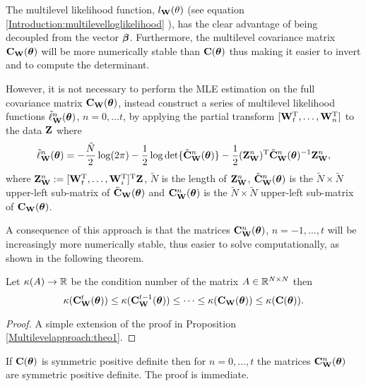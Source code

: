 \documentclass[11pt,final]{amsart}       %
\begin{document}
The multilevel likelihood function, $l_{\mathbf{W}}(\theta)$ (see equation
\eqref {Introduction:multilevelloglikelihood} ), has the clear
advantage of being decoupled from the vector $\boldsymbol{\beta}$. Furthermore,
the multilevel covariance matrix $\mathbf{C}_{\mathbf{W}}(\boldsymbol{\theta})$ will be more
numerically stable than $\mathbf{C}(\boldsymbol{\theta})$ thus making it easier to invert
and to compute the determinant.

However, it is not necessary to perform the MLE estimation on the full
covariance matrix $\mathbf{C}_{\mathbf{W}}(\boldsymbol{\theta})$, instead construct a series of
multilevel likelihood functions $\tilde{\ell}^n_{\mathbf{W}}(\boldsymbol{\theta})$, $n =
0,\dots t$, by applying the partial transform $[\mathbf{W}_t ^{\rm T}, \dots, \mathbf{W}_n
  ^{\rm T} ]$ to the data $\mathbf{Z}$ where
\begin{equation}
  \begin{split}
\tilde{\ell}^n_{\mathbf{W}}(\boldsymbol{\theta})
=-\frac{\tilde{N}}{2}\log(2\pi)-\frac{1}{2}\log
\det\{\tilde{\mathbf{C}}_{\mathbf{W}}^n(\boldsymbol{\theta})\}
-\frac{1}{2}(\mathbf{Z}^n_{\mathbf{W}})^{\rm T}\tilde{\mathbf{C}}^n_{\mathbf{W}}(\boldsymbol{\theta})^{-1}\mathbf{Z}^n_{\mathbf{W}},
\end{split}
\label{Introduction:multilevelloglikelihoodreduced2}
\end{equation}
where $\mathbf{Z}^n_{\mathbf{W}} :=[\mathbf{W}_t ^{\rm T}, \dots, \mathbf{W}_i ^{\rm T} ] ^{\rm T} \mathbf{Z}$,
$\tilde{N}$ is the length of $\mathbf{Z}^n_{\mathbf{W}}$,
$\tilde{\mathbf{C}}^n_{\mathbf{W}}(\boldsymbol{\theta})$ is the $\tilde{N} \times \tilde{N}$
upper-left sub-matrix of $\tilde{\mathbf{C}}_{\mathbf{W}}(\boldsymbol{\theta})$ and
$\mathbf{C}^n_{\mathbf{W}}(\boldsymbol{\theta})$ is the $\tilde{N} \times \tilde{N}$ upper-left
sub-matrix of $\mathbf{C}_{\mathbf{W}}(\boldsymbol{\theta})$.

A consequence of this approach is that the matrices
$\mathbf{C}^n_{\mathbf{W}}(\boldsymbol{\theta})$, $n = -1, \dots, t$ will be increasingly more
numerically stable, thus easier to solve computationally, as shown in
the following theorem.
\begin{prop} 
  \label{Multilevelapproach:theo2}
Let $\kappa(A) \rightarrow \Bbb{R}$ be the condition number of the matrix
$A \in \Bbb{R}^{N \times N}$ then
\[
\kappa(\mathbf{C}^{t}_{\mathbf{W}}(\boldsymbol{\theta})) \leq \kappa(\mathbf{C}^{t-1}_{\mathbf{W}}(\boldsymbol{\theta})) \leq 
\dots
\leq
\kappa(\mathbf{C}_{\mathbf{W}}(\boldsymbol{\theta})) \leq
\kappa(\mathbf{C}(\boldsymbol{\theta})).
\]
\end{prop} 
\begin{proof} A simple extension of the proof in 
Proposition \ref{Multilevelapproach:theo1}.
\end{proof}



\begin{remark} If $\mathbf{C}(\boldsymbol{\theta})$ is symmetric positive definite 
then for $n = 0, \dots, t$ the matrices $\mathbf{C}^{n}_{\mathbf{W}}(\boldsymbol{\theta})$ are
symmetric positive definite. The proof is immediate.
\end{remark}
\end{document}
